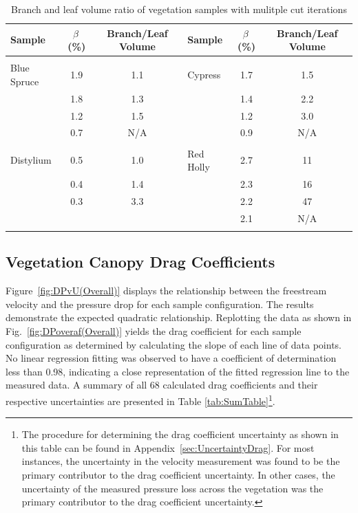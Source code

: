 \documentclass[12pt]{article}
\begin{document}
\begin{table}[!h]
\caption[Branch and leaf volume ratio of vegetation samples]{Branch and leaf volume ratio of vegetation samples with mulitple cut iterations}
\label{tab:RatioTable}
\centering
	
	\begin{tabular*}{\textwidth}{lcclcc}	
			\hline
\rule{0pt}{14pt}\textbf{Sample}	&\textbf{$\beta$\,(\%)}	& {\bf Branch/Leaf Volume}  \hspace{.2in}  		&\textbf{Sample}		&	\textbf{$\beta$\,(\%)}	& {\bf Branch/Leaf Volume}	\\
\hline
\\[0.01cm]
Blue Spruce		    		&	1.9			& 	1.1			        				& Cypress       		&	1.7		&	1.5						\\
					&	1.8			& 	1.3							&				&	1.4		&	2.2						\\
					&	1.2			& 	1.5							&				&	1.2		&	3.0						\\
					&	0.7			&	N/A							&				&	0.9		&  	N/A 						\\
					&				&								&				&			&       							\\
Distylium				&	0.5			&	1.0							& Red Holly	     		&	2.7		&	11						\\
					&	0.4			&	1.4							&				&	2.3		&	16						\\
					&	0.3			&	3.3							&				&	2.2		&	47						\\
					&				&								&				&	2.1		&        N/A 						\\
\\[0.005cm]
\hline														

\end{tabular*}
\end{table}

\pagebreak


\subsection{Vegetation Canopy Drag Coefficients}
\label{ssec:headingscap}

Figure~\ref{fig:DPvU(Overall)} displays the relationship between the freestream velocity and the pressure drop for each sample configuration. The results demonstrate the expected quadratic relationship. Replotting the data as shown in Fig.~\ref{fig:DPoveraf(Overall)} yields the drag coefficient for each sample configuration as determined by calculating the slope of each line of data points. No linear regression fitting was observed to have a coefficient of determination less than 0.98, indicating a close representation of the fitted regression line to the measured data. A summary of all 68 calculated drag coefficients and their respective uncertainties are presented in Table \ref{tab:SumTable}\footnote{The procedure for determining the drag coefficient uncertainty as shown in this table can be found in Appendix~\ref{sec:UncertaintyDrag}. For most instances, the uncertainty in the velocity measurement was found to be the primary contributor to the drag coefficient uncertainty. In other cases, the uncertainty of the measured pressure loss across the vegetation was the primary contributor to the drag coefficient uncertainty.}.
\end{document}
